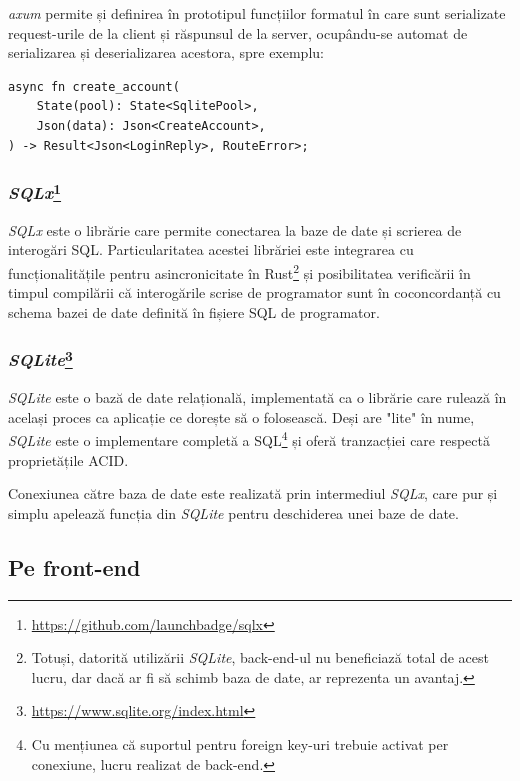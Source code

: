 \documentclass{article}
\begin{document}
    \emph{axum} permite și definirea în prototipul funcțiilor formatul în care sunt serializate request-urile de la client
    și răspunsul de la server, ocupându-se automat de serializarea și deserializarea acestora, spre exemplu:
    \begin{verbatim}
async fn create_account(
    State(pool): State<SqlitePool>,
    Json(data): Json<CreateAccount>,
) -> Result<Json<LoginReply>, RouteError>;
    \end{verbatim}

    \subsubsection*{\emph{SQLx}\footnote{\url{https://github.com/launchbadge/sqlx}}}

    \emph{SQLx} este o librărie care permite conectarea la baze de date și scrierea de interogări SQL.
    Particularitatea acestei librăriei este integrarea cu funcționalitățile pentru asincronicitate în
    Rust\footnote{Totuși, datorită utilizării \emph{SQLite}, back-end-ul nu beneficiază total de acest lucru,
    dar dacă ar fi să schimb baza de date, ar reprezenta un avantaj.} și posibilitatea verificării în timpul
    compilării că interogările scrise de programator sunt în coconcordanță cu schema bazei de date definită
    în fișiere SQL de programator.

    \subsubsection*{\emph{SQLite}\footnote{\url{https://www.sqlite.org/index.html}}}

    \emph{SQLite} este o bază de date relațională, implementată ca o librărie care rulează în același proces ca
    aplicație ce dorește să o folosească. Deși are "lite" în nume, \emph{SQLite} este o implementare completă a
    SQL\footnote{Cu mențiunea că suportul pentru foreign key-uri trebuie activat per conexiune, lucru realizat de
    back-end.} și oferă tranzacției care respectă proprietățile ACID.

    Conexiunea către baza de date este realizată prin intermediul \emph{SQLx}, care pur și simplu apelează funcția
    din \emph{SQLite} pentru deschiderea unei baze de date.

    \subsection{Pe front-end}
\end{document}
